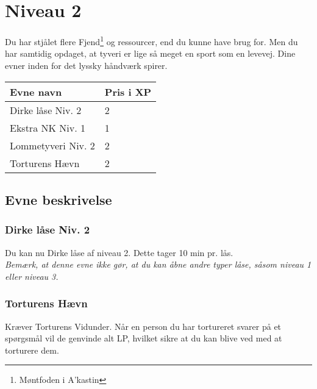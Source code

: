 \chapter{Niveau 2}
Du har stjålet flere Fjend\footnote{Møntfoden i A'kastin} og ressourcer, end du kunne have brug for. Men du har samtidig opdaget, at tyveri er lige så meget en sport som en levevej. Dine evner inden for det lyssky håndværk spirer.

\begin{table}[H]
    \centering
    \begin{tabular}{|p{}|p{}|}
    \rowcolor{cerulean!80}\hline
        Evne navn & Pris i XP \\\hline
         Dirke låse Niv. 2 & 2 \\\hline
         Ekstra NK Niv. 1 & 1 \\\hline
         Lommetyveri Niv. 2 & 2 \\\hline
         Torturens Hævn & 2\\\hline
    \end{tabular}
\end{table}
\section{Evne beskrivelse}

\subsection{Dirke låse Niv. 2}
Du kan nu Dirke låse af niveau 2. Dette tager 10 min pr. lås.\\
\emph{Bemærk, at denne evne ikke gør, at du kan åbne andre typer låse, såsom niveau 1 eller niveau 3.}\\





\subsection{Torturens Hævn}
Kræver Torturens Vidunder. Når en person du har tortureret svarer på et spørgsmål vil de genvinde alt LP, hvilket sikre at du kan blive ved med at torturere dem.